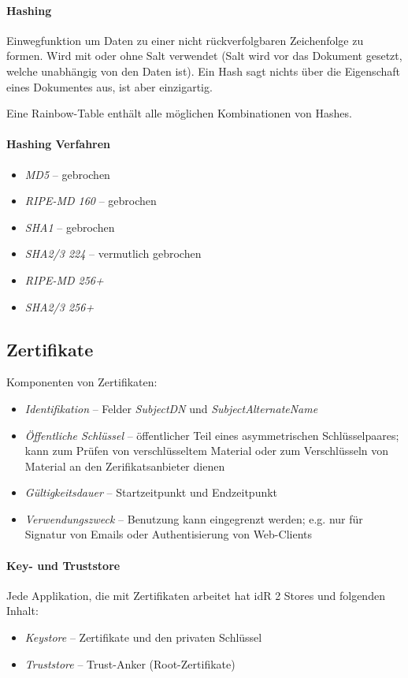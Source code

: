 \documentclass[a4paper,12pt]{article}
\begin{document}
\paragraph{Hashing}
Einwegfunktion um Daten zu einer nicht rückverfolgbaren Zeichenfolge zu formen. Wird mit oder ohne Salt verwendet (Salt wird vor das Dokument gesetzt, welche unabhängig von den Daten ist). Ein Hash sagt nichts über die Eigenschaft eines Dokumentes aus, ist aber einzigartig.

Eine Rainbow-Table enthält alle möglichen Kombinationen von Hashes.

\paragraph{Hashing Verfahren}
\begin{itemize}
\item \emph{MD5} -- gebrochen
\item \emph{RIPE-MD 160} -- gebrochen
\item \emph{SHA1} -- gebrochen
\item \emph{SHA2/3 224} -- vermutlich gebrochen
\item \emph{RIPE-MD 256+}
\item \emph{SHA2/3 256+}
\end{itemize}

\subsection{Zertifikate}
Komponenten von Zertifikaten:
\begin{itemize}
\item \emph{Identifikation} -- Felder \emph{SubjectDN} und \emph{SubjectAlternateName}
\item \emph{Öffentliche Schlüssel} -- öffentlicher Teil eines asymmetrischen Schlüsselpaares; kann zum Prüfen von verschlüsseltem Material oder zum Verschlüsseln von Material an den Zerifikatsanbieter dienen
\item \emph{Gültigkeitsdauer} -- Startzeitpunkt und Endzeitpunkt
\item \emph{Verwendungszweck} -- Benutzung kann eingegrenzt werden; e.g. nur für Signatur von Emails oder Authentisierung von Web-Clients
\end{itemize}

\paragraph{Key- und Truststore}
Jede Applikation, die mit Zertifikaten arbeitet hat idR 2 Stores und folgenden Inhalt:
\begin{itemize}
\item \emph{Keystore} -- Zertifikate und den privaten Schlüssel
\item \emph{Truststore} -- Trust-Anker (Root-Zertifikate)
\end{itemize}
\end{document}

